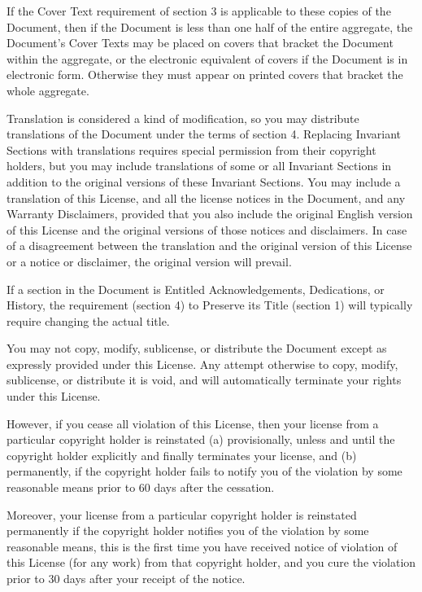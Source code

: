 \begin{BookLicense}
If the Cover Text requirement of section 3 is applicable to these copies of the Document, then if the Document is less than one half of the entire aggregate, the Document's Cover Texts may be placed on covers that bracket the Document within the aggregate, or the electronic equivalent of covers if the Document is in electronic form. Otherwise they must appear on printed covers that bracket the whole aggregate.

Translation is considered a kind of modification, so you may distribute translations of the Document under the terms of section 4. Replacing Invariant Sections with translations requires special permission from their copyright holders, but you may include translations of some or all Invariant Sections in addition to the original versions of these Invariant Sections. You may include a translation of this License, and all the license notices in the Document, and any Warranty Disclaimers, provided that you also include the original English version of this License and the original versions of those notices and disclaimers. In case of a disagreement between the translation and the original version of this License or a notice or disclaimer, the original version will prevail.

If a section in the Document is Entitled \BookQuoteChar{}Acknowledgements\BookQuoteChar{}, \BookQuoteChar{}Dedications\BookQuoteChar{}, or \BookQuoteChar{}History\BookQuoteChar{}, the requirement (section 4) to Preserve its Title (section 1) will typically require changing the actual title.

You may not copy, modify, sublicense, or distribute the Document except as expressly provided under this License. Any attempt otherwise to copy, modify, sublicense, or distribute it is void, and will automatically terminate your rights under this License.

However, if you cease all violation of this License, then your license from a particular copyright holder is reinstated (a) provisionally, unless and until the copyright holder explicitly and finally terminates your license, and (b) permanently, if the copyright holder fails to notify you of the violation by some reasonable means prior to 60 days after the cessation.

Moreover, your license from a particular copyright holder is reinstated permanently if the copyright holder notifies you of the violation by some reasonable means, this is the first time you have received notice of violation of this License (for any work) from that copyright holder, and you cure the violation prior to 30 days after your receipt of the notice.


\end{BookLicense}
